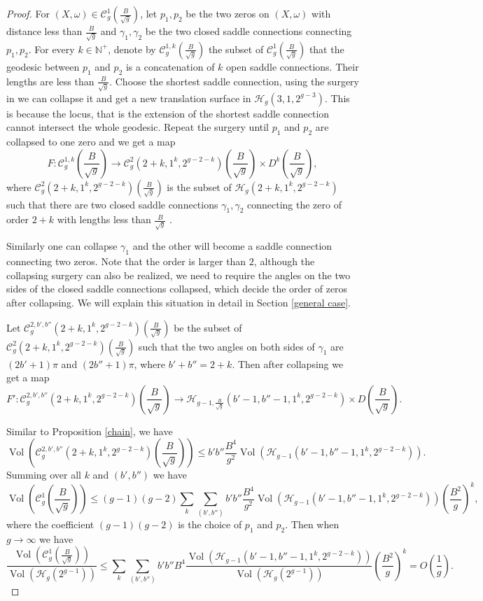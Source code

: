 \documentclass[12pt]{amsart} %
\theoremstyle{definition}
\theoremstyle{remark}
\numberwithin{equation}{section}
\renewcommand\H{{\mathcal H}}
\newcommand{\V}{\operatorname{Vol}}
\begin{document}
\begin{proof}
For $(X,\omega) \in \mathcal{C}_g^{1}(\frac{B}{\sqrt{g}})$, let $p_1, p_2$ be the two zeros on $(X,\omega)$ with distance less than $\frac{B}{\sqrt{g}}$ 
and $\gamma_1, \gamma_2$ be the two closed saddle connections connecting $p_1, p_2$.
For every $k\in \mathbb{N}^+$, denote by $\mathcal{C}_g^{1,k}(\frac{B}{\sqrt{g}})$ the subset of $\mathcal{C}_g^{1}(\frac{B}{\sqrt{g}})$
that the geodesic between $p_1$ and $p_2$ is a concatenation of $k$ open saddle connections.
Their lengths are less than $\frac{B}{\sqrt{g}}$.
Choose the shortest saddle connection, using the surgery in \cite{masur2024lengths} we can collapse it and get a new translation surface in 
$\H_g(3,1,2^{g-3})$. This is because the locus, that is the extension of the shortest saddle connection cannot intersect the whole geodesic.
Repeat the surgery until $p_1$ and $p_2$ are collapsed to one zero and we get a map
$$F:\mathcal{C}_g^{1,k}(\frac{B}{\sqrt{g}})\to \mathcal{C}_g^{2}(2+k,1^k,2^{g-2-k})(\frac{B}{\sqrt{g}})\times D^k(\frac{B}{\sqrt{g}}),$$
where $\mathcal{C}_g^{2}(2+k,1^k,2^{g-2-k})(\frac{B}{\sqrt{g}})$ is the subset of $\H_g(2+k,1^k,2^{g-2-k})$ such that there are
two closed saddle connections $\gamma_1, \gamma_2$ connecting the zero of order $2+k$ with lengths less than $\frac{B}{\sqrt{g}}$ .


Similarly one can collapse $\gamma_1$ and the other will become a saddle connection connecting two zeros. 
Note that the order is larger than $2$, although the collapsing surgery can also be realized, we need to require the angles 
on the two sides of the closed saddle connections collapsed, which decide the order of zeros after collapsing. 
We will explain this situation in detail in Section \ref{general case}.


Let $\mathcal{C}_g^{2,b',b''}(2+k,1^k,2^{g-2-k})(\frac{B}{\sqrt{g}})$ be the subset of 
$\mathcal{C}_g^{2}(2+k,1^k,2^{g-2-k})(\frac{B}{\sqrt{g}})$ such that 
the two angles on both sides of $\gamma_1$ are $(2b'+1)\pi$ and $(2b''+1)\pi$, where $b'+b''=2+k$.
Then after collapsing we get a map
$$F':\mathcal{C}_g^{2,b',b''}(2+k,1^k,2^{g-2-k})(\frac{B}{\sqrt{g}}) \to \H_{g-1,\frac{B}{\sqrt{g}}}(b'-1,b''-1,1^k,2^{g-2-k})\times D(\frac{B}{\sqrt{g}}).$$


Similar to Proposition \ref{chain}, we have
$$\V(\mathcal{C}_g^{2,b',b''}(2+k,1^k,2^{g-2-k})(\frac{B}{\sqrt{g}}))\leq b'b''\frac{B^4}{g^2}\V(\H_{g-1}(b'-1,b''-1,1^k,2^{g-2-k})).$$
Summing over all $k$ and $(b',b'')$ we have
$$\V(\mathcal{C}_g^{1}(\frac{B}{\sqrt{g}}))\leq (g-1)(g-2)\sum_k \sum_{(b',b'')}b'b''\frac{B^4}{g^2}\V(\H_{g-1}(b'-1,b''-1,1^k,2^{g-2-k}))(\frac{B^2}{g})^k,$$
where the coefficient $(g-1)(g-2)$ is the choice of $p_1$ and $p_2$.
Then when $g\to \infty$ we have
$$\frac{\V(\mathcal{C}_g^{1}(\frac{B}{\sqrt{g}}))}{\V(\H_g(2^{g-1}))}\leq
\sum_k \sum_{(b',b'')}b'b''B^4\frac{\V(\H_{g-1}(b'-1,b''-1,1^k,2^{g-2-k}))}{\V(\H_g(2^{g-1}))}(\frac{B^2}{g})^k=O(\frac{1}{g}).$$
\end{proof}
\end{document}
